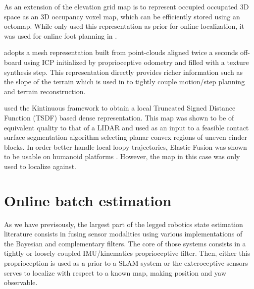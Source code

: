 As an extension of the elevation grid map is to represent occupied occupated 3D space as an 3D occupancy voxel map, which can be efficiently stored using an octomap.
While \cite{fallon2014drift} only used this representation as prior for online localization, it was used for online foot planning in \cite{winkler2015planning, mastalli2015line}. 

\cite{kolter2009stereo} adopts a mesh representation built from point-clouds aligned twice a seconds off-board using ICP initialized by proprioceptive odometry and filled with
a texture synthesis step. This representation directly provides richer information such as the slope of the terrain which is used in \cite{mastalli2020motion} to 
tightly couple motion/step planning and terrain reconstruction. 


\cite{fallon2015continuous} used the Kintinuous framework to obtain a local Truncated Signed Distance Function (TSDF) based dense representation. This map was
shown to be of equivalent quality to that of a LIDAR and used as an input to a feasible contact surface segmentation algorithm selecting planar convex regions of uneven cinder blocks. 
In order better handle local loopy trajectories, Elastic Fusion was shown to be usable on humanoid platforms \cite{scona2017direct}. However, the map in this case was only used to localize against.










\section{Online batch estimation}
As we have previsously, the largest part of the legged robotics state estimation literature consists in fusing sensor modalities using various 
implementations of the Bayesian and complementary filters. The core of those systems consists in a tightly or loosely coupled IMU/kinematics proprioceptive
filter. Then, either this proprioception is used as a prior to a SLAM system or the exteroceptive sensors serves to localize with respect to a known map,
making position and yaw observable.

